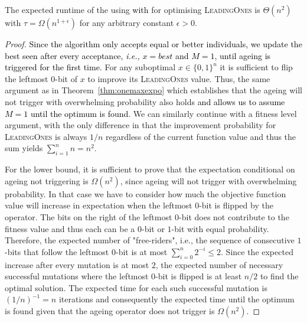 \begin{theorem} \label{thm:leadingonesexpo}
	The expected runtime of  the  using \IPHfcm{}  %
	\textcolor{black}{ with {\linHD }}  for optimising
	\textsc{LeadingOnes} is $\Theta(n^2)$ with $\tau=\Omega(n^{1+\epsilon})$ {\color{black}for any arbitrary} 
	constant $\epsilon>0$.
\end{theorem}
\begin{proof}
	
	
	\textcolor{black}{Since the algorithm only accepts equal or better individuals, we update the best seen after every acceptance, \emph{i.e.,} $x=best$ and $M=1$, until ageing is triggered for the first time.  }
	For any suboptimal $x\in\{0,1\}^n$ it is sufficient to flip the leftmost $0$-bit of $x$ to improve its \textsc{LeadingOnes} value. Thus, the same argument as in Theorem~\ref{thm:onemaxexpo} which establishes that the ageing will not trigger with overwhelming probability also holds \textcolor{black}{and allows us to assume $M=1$ until the optimum is found}. We can similarly continue with a fitness level argument, {\color{black} with the only difference in that} the improvement probability for \textsc{LeadingOnes} is always $1/n$ regardless of the current function value and thus the sum yields $\sum\limits_{i=1}^{n}n = n^2$.
	
	For the lower bound, it is sufficient to prove that the {\color{black}expectation conditional on ageing not triggering} is $\Omega(n^2)$, since ageing will not trigger with overwhelming probability. In that case we have to consider how much the objective function value will increase in expectation when the leftmost $0$-bit is flipped by the operator. The bits on the right of the leftmost $0$-bit does not contribute to the fitness value and thus each can be a $0$-bit or $1$-bit with equal probability. Therefore, the expected number of "free-riders", i.e., the sequence of consecutive $1$-bits that follow the leftmost $0$-bit is at most $\sum_{i=0}^{n}2^{-i}\leq 2$. Since the expected increase after every mutation is at most $2$, the expected number of necessary successful mutations where the leftmost $0$-bit is flipped is at least $n/2$ to find the optimal solution. The expected time for each such successful mutation is $(1/n)^{-1}=n$ iterations and consequently the expected time until the optimum is found given that the ageing operator does not trigger is $\Omega(n^2)$.  
	
\end{proof}